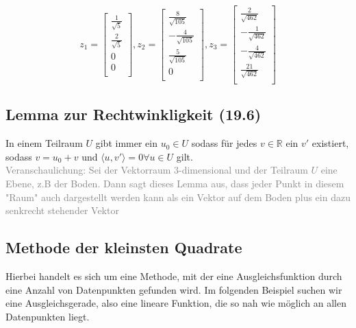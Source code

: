 \documentclass{article}
\begin{document}
				\begin{equation*}
					z_1 = \begin{bmatrix} \frac1{\sqrt{5}} \\ \frac2{\sqrt{5}} \\ 0 \\ 0 \\ \end{bmatrix},
					z_2 = \begin{bmatrix} \frac8{\sqrt{105}} \\ -\frac4{\sqrt{105}} \\ \frac5{\sqrt{105}} \\ 0 \\ \end{bmatrix}, 
					z_3 = \begin{bmatrix} \frac2{\sqrt{462}} \\ -\frac1{\sqrt{462}} \\ -\frac4{\sqrt{462}} \\ \frac{21}{\sqrt{462}} \\ \end{bmatrix}
				\end{equation*}
			\subsection{Lemma zur Rechtwinkligkeit (19.6)}
				In einem Teilraum $U$ gibt immer ein $u_0 \in U$ sodass für jedes $v \in \mathbb{R}$ ein $v'$ existiert, sodass $v = u_0 + v$ und $\langle u, v'\rangle = 0 \forall u \in U$ gilt.\\
				\textcolor{gray}{Veranschaulichung: Sei der Vektorraum 3-dimensional und der Teilraum $U$ eine Ebene, z.B der Boden. Dann sagt dieses Lemma aus, dass jeder Punkt in diesem "Raum" auch dargestellt werden kann als ein Vektor auf dem Boden plus ein dazu senkrecht stehender Vektor}
		\subsection{Methode der kleinsten Quadrate}
			Hierbei handelt es sich um eine Methode, mit der eine Ausgleichsfunktion durch eine Anzahl von Datenpunkten gefunden wird. Im folgenden Beispiel suchen wir eine Ausgleichsgerade, also eine lineare Funktion, die so nah wie möglich an allen Datenpunkten liegt.
\end{document}
